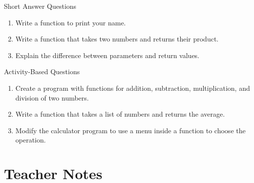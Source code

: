 \begin{exercise}{Short Answer Questions}
\begin{enumerate}
    \item Write a function to print your name.  
    \item Write a function that takes two numbers and returns their product.  
    \item Explain the difference between parameters and return values.  
\end{enumerate}
\end{exercise}

\begin{exercise}{Activity-Based Questions}
\begin{enumerate}
    \item Create a program with functions for addition, subtraction, multiplication, and division of two numbers.  
    \item Write a function that takes a list of numbers and returns the average.  
    \item Modify the calculator program to use a menu inside a function to choose the operation.  
\end{enumerate}
\end{exercise}

\section{Teacher Notes}

